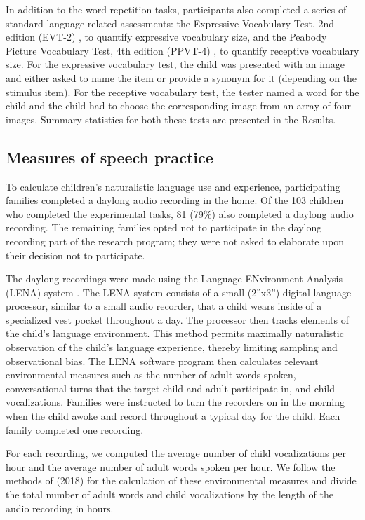 \documentclass[a4paper,man,natbib,donotrepeattitle, apacite]{apa6}
\begin{document}
In addition to the word repetition tasks, participants also completed a series of standard language-related assessments: the Expressive Vocabulary Test, 2nd edition (EVT-2) \cite{williamsExpressiveVocabularyTest2007}, to quantify expressive vocabulary size, and the Peabody Picture Vocabulary Test, 4th edition (PPVT-4) \cite{dunnPPVT4PeabodyPicture2007}, to quantify receptive vocabulary size. For the expressive vocabulary test, the child was presented with an image and either asked to name the item or provide a synonym for it (depending on the stimulus item). For the receptive vocabulary test, the tester named a word for the child and the child had to choose the corresponding image from an array of four images. Summary statistics for both these tests are presented in the Results.

\subsection{Measures of speech practice}

To calculate children’s naturalistic language use and experience, participating families completed a daylong audio recording in the home. Of the 103 children who completed the experimental tasks, 81 (79\%) also completed a daylong audio recording. The remaining families opted not to participate in the daylong recording part of the research program; they were not asked to elaborate upon their decision not to participate. 

The daylong recordings were made using the Language ENvironment Analysis (LENA) system \cite{greenwoodAssessingChildrenHome2011}. The LENA system consists of a small (2”x3”) digital language processor, similar to a small audio recorder, that a child wears inside of a specialized vest pocket throughout a day. The processor then tracks elements of the child’s language environment. This method permits maximally naturalistic observation of the child’s language experience, thereby limiting sampling and observational bias. The LENA software program then calculates relevant environmental measures such as the number of adult words spoken, conversational turns that the target child and adult participate in, and child vocalizations. Families were instructed to turn the recorders on in the morning when the child awoke and record throughout a typical day for the child. Each family completed one recording. 

For each recording, we computed the average number of child vocalizations per hour and the average number of adult words spoken per hour. We follow the methods of \citeauthor{mahrUsingLanguageInput2018} (2018) for the calculation of these environmental measures and divide the total number of adult words and child vocalizations by the length of the audio recording in hours.  
\end{document}
